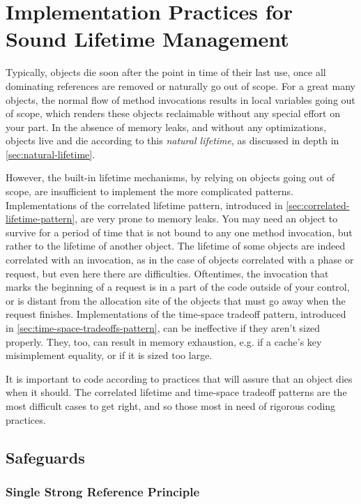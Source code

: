 \chapter{Implementation Practices for Sound Lifetime Management}
\label{chapter:lifetime-implementation-strategies}

Typically, objects die soon after the point in time of their last use, once all
dominating references are removed or naturally go out of scope. For a great many
objects, the normal flow of method invocations results in local variables going
out of scope, which renders these objects reclaimable without any special effort
on your part. In the absence of memory leaks, and without any optimizations,
objects live and die according to this \emph{natural lifetime}, as discussed in
depth in \autoref{sec:natural-lifetime}. 

However, the built-in lifetime mechanisms, by relying on objects going out of
scope, are insufficient to implement the more complicated patterns.
Implementations of the correlated lifetime pattern, introduced in
\autoref{sec:correlated-lifetime-pattern}, are very prone to memory leaks. You
may need an object to survive for a period of time that is not bound to any one
method invocation, but rather to the lifetime of another object. The lifetime of
some objects are indeed correlated with an invocation, as in the case of objects
correlated with a phase or request, but even here there are difficulties.
Oftentimes, the invocation that marks the beginning of a request is in a part of
the code outside of your control, or is distant from the allocation site of the
objects that must go away when the request finishes. Implementations of the
time-space tradeoff pattern, introduced in
\autoref{sec:time-space-tradeoffs-pattern}, can be ineffective if they aren't
sized properly. They, too, can result in memory exhaustion, e.g. if a cache's key
misimplement equality, or if it is sized too large.

It is important to code according to practices that will assure that an object
dies when it should. The correlated lifetime and time-space tradeoff patterns are
the most difficult cases to get right, and so those most in need of rigorous
coding practices.


\section{Safeguards}
\subsection{Single Strong Reference Principle}
